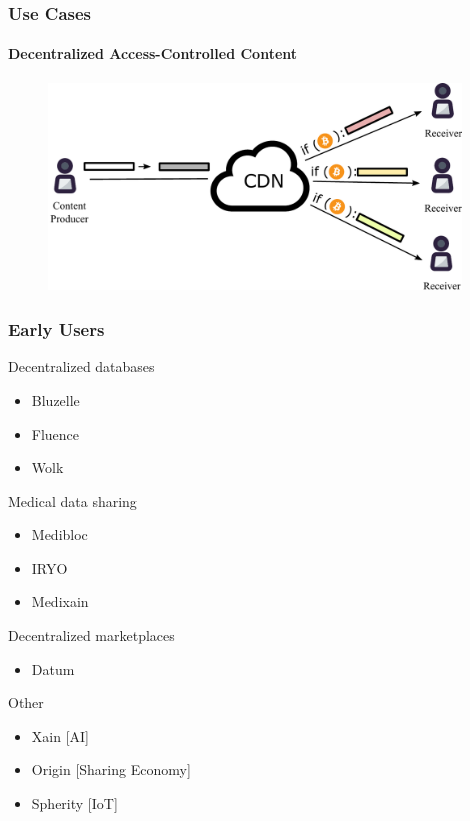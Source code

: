 \documentclass[xetex,mathsans,sans]{beamer}
\begin{document}
    \begin{frame}
        \frametitle{Use Cases}
        \framesubtitle{Decentralized Access-Controlled Content}
        \begin{figure}
            \centering
            \includegraphics[height=5.5cm]{pdf/content.pdf}
        \end{figure}
    \end{frame}

    \begin{frame}
      \frametitle{Early Users}
      Decentralized databases
      \begin{itemize}
          \item Bluzelle
          \item Fluence
          \item Wolk
      \end{itemize}
      Medical data sharing
      \begin{itemize}
          \item Medibloc
          \item IRYO
          \item Medixain
      \end{itemize}
      Decentralized marketplaces
      \begin{itemize}
          \item Datum
      \end{itemize}
      Other
      \begin {itemize}
          \item Xain [AI]
          \item Origin [Sharing Economy]
          \item Spherity [IoT]
      \end{itemize}
    \end{frame}
\end{document}
